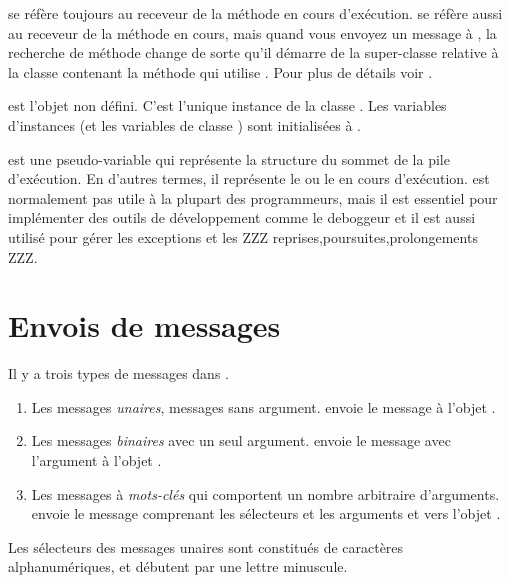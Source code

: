 \documentclass[a4paper,10pt,twoside]{book}
\begin{document}
 se r\'{e}f\`{e}re toujours au receveur de la m\'{e}thode en cours d'ex\'{e}cution.
 se r\'{e}f\`{e}re aussi au receveur de la m\'{e}thode en cours, mais quand vous envoyez un message \`{a} \super, la recherche de m\'{e}thode change de sorte qu'il d\'{e}marre de la super-classe relative \`{a} la classe contenant la m\'{e}thode qui utilise .
Pour plus de d\'{e}tails voir .

 est l'objet non d\'{e}fini.
C'est l'unique instance de la classe . 
Les variables d'instances (et les variables de classe ) sont initialis\'{e}es \`{a} .

 est une pseudo-variable qui repr\'{e}sente la structure du sommet de la pile d'ex\'{e}cution.
En d'autres termes, il repr\'{e}sente le  ou le  en cours d'ex\'{e}cution.
 est normalement pas utile \`{a} la plupart des programmeurs, mais il est essentiel pour impl\'{e}menter des outils de d\'{e}veloppement comme le deboggeur et il est aussi utilis\'{e} pour g\'{e}rer les exceptions  et les {ZZZ reprises,poursuites,prolongements ZZZ}.

\section{Envois de messages}

Il y a trois types de messages dans \sq.
\begin{enumerate}
  \item Les messages \emph{unaires}, messages sans argument.
   envoie le message   \`{a} l'objet .
  \item Les messages \emph{binaires} avec un seul argument.
  	 envoie le message \ct{+} avec l'argument  \`{a} l'objet .
  \item Les messages \`{a} \emph{mots-cl\'{e}s} qui comportent un nombre arbitraire d'arguments.
  	 envoie le message comprenant les s\'{e}lecteurs 	 et les arguments  et  vers l'objet .
\end{enumerate}

Les s\'{e}lecteurs des messages unaires sont constitu\'{e}s de caract\`{e}res alphanum\'{e}riques, et d\'{e}butent par une lettre minuscule. 
\end{document}
